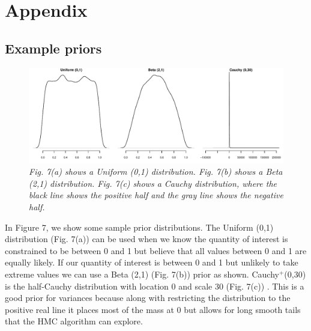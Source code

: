 \documentclass{article}
\begin{document}
\section{Appendix}
\subsection*{Example priors}
\begin{figure}[H]
\centering
\includegraphics[width=\textwidth, height=\textheight, keepaspectratio]{prior_plot.pdf}
\caption{\emph{Fig. 7(a) shows a Uniform (0,1) distribution. Fig. 7(b) shows a Beta (2,1) distribution. Fig. 7(c) shows a Cauchy distribution, where the black line shows the positive half and the gray line shows the negative half.}}
\end{figure}
In Figure 7, we show some sample prior distributions. The Uniform (0,1) distribution (Fig. 7(a)) can be used when we know the quantity of interest is constrained to be between 0 and 1 but believe that all values between 0 and 1 are equally likely. If our quantity of interest is between 0 and 1 but unlikely to take extreme values we can use a Beta (2,1) (Fig. 7(b))  prior as shown.  Cauchy$^{+}$(0,30) is the half-Cauchy distribution with location 0 and scale 30 (Fig. 7(c)) . This is a good prior for variances because along with restricting the distribution to the positive real line it places most of the mass at 0 but allows for long smooth tails that the HMC algorithm can explore. 
\end{document}
